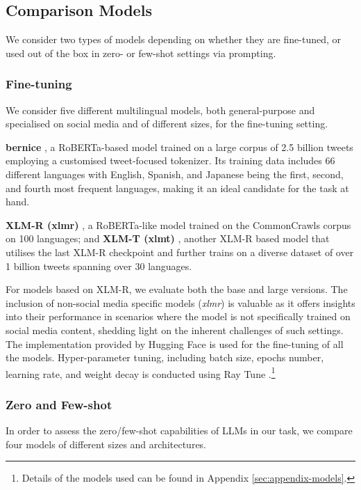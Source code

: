 \subsection{Comparison Models}
\label{sec:models}

We consider two types of models depending on whether they are fine-tuned, or used out of the box in zero- or few-shot settings via prompting.

\subsubsection{Fine-tuning}
We consider five different multilingual models, both general-purpose and specialised on social media and of different sizes, for the fine-tuning setting. %

\noindent \textbf{bernice} \cite{delucia2022bernice}, a RoBERTa-based model trained on a large corpus of 2.5 billion tweets employing a customised tweet-focused tokenizer. Its training data includes 66 different languages with English, Spanish, and Japanese being the first, second, and fourth most frequent languages, making it an ideal candidate for the task at hand.

\noindent  \textbf{XLM-R (xlmr)} \cite{conneau2019unsupervised}, a RoBERTa-like model trained on the CommonCrawls corpus \cite{wenzek2020ccnet} on 100 languages; and \textbf{XLM-T (xlmt)} \cite{barbieri2021xlm}, another XLM-R based model that utilises the last XLM-R checkpoint and further trains on a diverse dataset of over 1 billion tweets spanning over 30 languages.

For models based on XLM-R, we evaluate both the base and large versions. The inclusion of non-social media specific models (\textit{xlmr}) is valuable as it offers insights into their performance in scenarios where the model is not specifically trained on social media content, shedding light on the inherent challenges of such settings. The implementation provided by Hugging Face \cite{wolf-etal-2020-transformers} is used for the fine-tuning of all the models. Hyper-parameter tuning, including batch size, epochs number, learning rate, and weight decay is conducted using Ray Tune \cite{liaw2018tune}.\footnote{Details of the models used can be found in Appendix \ref{sec:appendix-models}.}


\subsubsection{Zero and Few-shot}
In order to assess the zero/few-shot capabilities of \acp{LLM} in our task, we compare four models of different sizes and architectures. %

